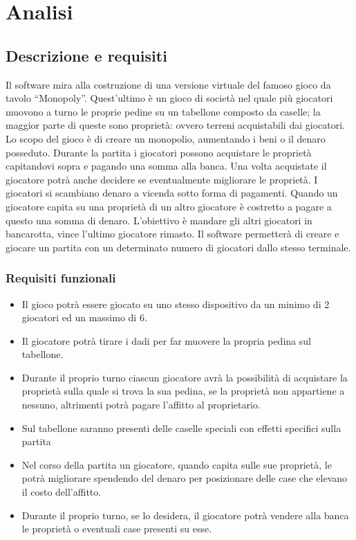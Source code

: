 \chapter{Analisi}

\section{Descrizione e requisiti}

Il software mira alla costruzione di una versione virtuale del famoso gioco da tavolo “Monopoly”. 
Quest’ultimo è un gioco di società nel quale più giocatori muovono a turno le proprie pedine su un tabellone 
composto da caselle; la maggior parte di queste sono proprietà: ovvero terreni acquistabili dai giocatori.
Lo scopo del gioco è di creare un monopolio, aumentando i beni o il denaro posseduto. 
Durante la partita i giocatori possono acquistare le proprietà capitandovi sopra e pagando una somma alla banca.
Una volta acquistate il giocatore potrà anche decidere se eventualmente migliorare le proprietà.
I giocatori si scambiano denaro a vicenda sotto 
forma di pagamenti. Quando un giocatore capita su una proprietà di un altro giocatore è costretto a pagare
a questo una somma di denaro. 
L’obiettivo è mandare gli altri giocatori in bancarotta, vince l’ultimo giocatore rimasto. 
Il software permetterà di creare e giocare un partita con un determinato numero di giocatori dallo 
stesso terminale.



\subsection*{Requisiti funzionali}
\begin{itemize}
    \item Il gioco potrà essere giocato su uno stesso dispositivo da un minimo di 2 giocatori ed un massimo di 6.
	\item Il giocatore potrà tirare i dadi per far muovere la propria pedina sul tabellone.
	\item Durante il proprio turno ciascun giocatore avrà la possibilità di acquistare la proprietà sulla quale 
    si trova la sua pedina, se la proprietà non appartiene a nessuno, altrimenti potrà pagare l’affitto al proprietario.
    \item Sul tabellone saranno presenti delle caselle speciali con effetti specifici sulla partita
    \item Nel corso della partita un giocatore, quando capita sulle sue proprietà, le potrà migliorare spendendo
    del denaro per posizionare delle case che elevano il costo dell’affitto.
    \item Durante il proprio turno, se lo desidera, il giocatore potrà vendere alla banca 
    le proprietà o eventuali case presenti su esse.
\end{itemize}


